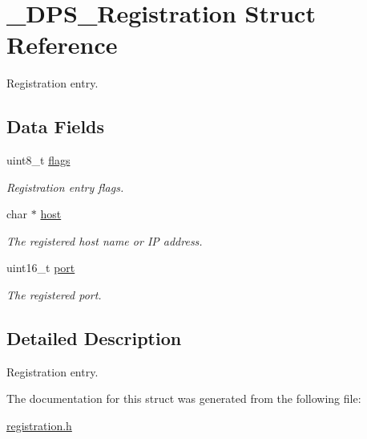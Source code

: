 \hypertarget{struct___d_p_s___registration}{}\section{\+\_\+\+D\+P\+S\+\_\+\+Registration Struct Reference}
\label{struct___d_p_s___registration}


Registration entry.  


\subsection*{Data Fields}
\begin{DoxyCompactItemize}
\item 
\mbox{\label{struct___d_p_s___registration_a0201a3f33b4b0ad0ed7134607ccc7ecb}} 
uint8\+\_\+t \hyperlink{struct___d_p_s___registration_a0201a3f33b4b0ad0ed7134607ccc7ecb}{flags}
\begin{DoxyCompactList}\small\item\em Registration entry flags. \end{DoxyCompactList}\item 
\mbox{\label{struct___d_p_s___registration_ae78f74ba04a5f9cf7a48d4aa39a3e774}} 
char $\ast$ \hyperlink{struct___d_p_s___registration_ae78f74ba04a5f9cf7a48d4aa39a3e774}{host}
\begin{DoxyCompactList}\small\item\em The registered host name or IP address. \end{DoxyCompactList}\item 
\mbox{\label{struct___d_p_s___registration_ab9ca063a4985209066220ac048085a57}} 
uint16\+\_\+t \hyperlink{struct___d_p_s___registration_ab9ca063a4985209066220ac048085a57}{port}
\begin{DoxyCompactList}\small\item\em The registered port. \end{DoxyCompactList}\end{DoxyCompactItemize}


\subsection{Detailed Description}
Registration entry. 

The documentation for this struct was generated from the following file\+:\begin{DoxyCompactItemize}
\item 
\hyperlink{registration_8h}{registration.\+h}\end{DoxyCompactItemize}
